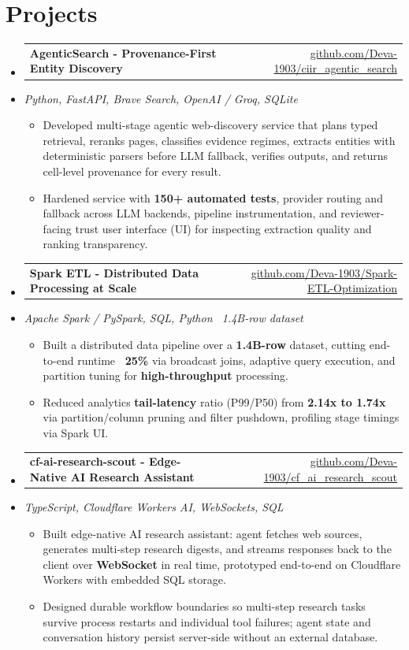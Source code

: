 \documentclass[letterpaper,10pt]{article}
\makeatletter
\newcommand{\resumeItem}[1]{
  \item\small{#1\vspace{-1pt}}
}
\newcommand{\resumeProjectHeading}[2]{
    \item
    \begin{tabular*}{0.985\textwidth}[t]{l@{\extracolsep{\fill}}r}
      \small\textbf{#1} & \small #2 \\
    \end{tabular*}\vspace{-5pt}
}
\newcommand{\resumeProjectSubheading}[1]{
  \vspace{-2pt}\item[] {\small\textcolor{ResumeSlate}{\emph{#1}}}\vspace{-3pt}
}
\newcommand{\resumeSubHeadingListStart}{\begin{itemize}[leftmargin=0.0in, label={}, itemsep=2pt, topsep=2pt]}
\newcommand{\resumeSubHeadingListEnd}{\end{itemize}}
\newcommand{\resumeItemListStart}{\begin{itemize}[leftmargin=0.18in, itemsep=2pt, topsep=1pt]}
\newcommand{\resumeItemListEnd}{\end{itemize}\vspace{-4pt}}
\makeatother
\begin{document}
\section{Projects}
\resumeSubHeadingListStart
  \resumeProjectHeading
    {AgenticSearch - Provenance-First Entity Discovery}
    {\href{https://github.com/Deva-1903/ciir_agentic_search}{github.com/Deva-1903/ciir\_agentic\_search}}
  \resumeProjectSubheading{Python, FastAPI, Brave Search, OpenAI / Groq, SQLite}
    \resumeItemListStart
      \resumeItem{Developed multi-stage agentic web-discovery service that plans typed retrieval, reranks pages, classifies evidence regimes, extracts entities with deterministic parsers before LLM fallback, verifies outputs, and returns cell-level provenance for every result.}
      \resumeItem{Hardened service with \textbf{150+ automated tests}, provider routing and fallback across LLM backends, pipeline instrumentation, and reviewer-facing trust user interface (UI) for inspecting extraction quality and ranking transparency.}
    \resumeItemListEnd
  \resumeProjectHeading
    {Spark ETL - Distributed Data Processing at Scale}
    {\href{https://github.com/Deva-1903/Spark-ETL-Optimization}{github.com/Deva-1903/Spark-ETL-Optimization}}
  \resumeProjectSubheading{Apache Spark / PySpark, SQL, Python \enspace\textbar\enspace ~1.4B-row dataset}
    \resumeItemListStart
      \resumeItem{Built a distributed data pipeline over a \textbf{1.4B-row} dataset, cutting end-to-end runtime \textbf{~25\%} via broadcast joins, adaptive query execution, and partition tuning for \textbf{high-throughput} processing.}
      \resumeItem{Reduced analytics \textbf{tail-latency} ratio (P99/P50) from \textbf{2.14x to 1.74x} via partition/column pruning and filter pushdown, profiling stage timings via Spark UI.}
    \resumeItemListEnd
  \resumeProjectHeading
    {cf-ai-research-scout - Edge-Native AI Research Assistant}
    {\href{https://github.com/Deva-1903/cf_ai_research_scout}{github.com/Deva-1903/cf\_ai\_research\_scout}}
  \resumeProjectSubheading{TypeScript, Cloudflare Workers AI, WebSockets, SQL}
    \resumeItemListStart
      \resumeItem{Built edge-native AI research assistant: agent fetches web sources, generates multi-step research digests, and streams responses back to the client over \textbf{WebSocket} in real time, prototyped end-to-end on Cloudflare Workers with embedded SQL storage.}
      \resumeItem{Designed durable workflow boundaries so multi-step research tasks survive process restarts and individual tool failures; agent state and conversation history persist server-side without an external database.}
    \resumeItemListEnd
\resumeSubHeadingListEnd
\vspace{-4pt}
\end{document}
